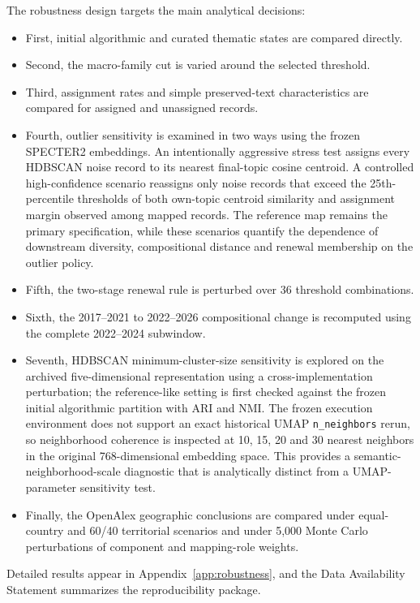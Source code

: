\documentclass[futureinternet,article,submit,moreauthors]{Definitions/mdpi}
\begin{document}
The robustness design targets the main analytical decisions:
\begin{itemize} 
    \item First, initial algorithmic and curated thematic states are compared directly. 
    \item Second, the macro-family cut is varied around the selected threshold. 
    \item Third, assignment rates and simple preserved-text characteristics are compared for assigned and unassigned records. 
    \item Fourth, outlier sensitivity is examined in two ways using the frozen SPECTER2 embeddings. An intentionally aggressive stress test assigns every HDBSCAN noise record to its nearest final-topic cosine centroid. A controlled high-confidence scenario reassigns only noise records that exceed the 25th-percentile thresholds of both own-topic centroid similarity and assignment margin observed among mapped records. The reference map remains the primary specification, while these scenarios quantify the dependence of downstream diversity, compositional distance and renewal membership on the outlier policy.
    \item Fifth, the two-stage renewal rule is perturbed over 36 threshold combinations. 
    \item Sixth, the 2017--2021 to 2022--2026 compositional change is recomputed using the complete 2022--2024 subwindow.
    \item Seventh, HDBSCAN minimum-cluster-size sensitivity is explored on the archived five-dimensional representation using a cross-implementation perturbation; the reference-like setting is first checked against the frozen initial algorithmic partition with ARI and NMI. The frozen execution environment does not support an exact historical UMAP \texttt{n\_neighbors} rerun, so neighborhood coherence is inspected at 10, 15, 20 and 30 nearest neighbors in the original 768-dimensional embedding space. This provides a semantic-neighborhood-scale diagnostic that is analytically distinct from a UMAP-parameter sensitivity test. 
    \item Finally, the OpenAlex geographic conclusions are compared under equal-country and 60/40 territorial scenarios and under 5,000 Monte Carlo perturbations of component and mapping-role weights.
\end{itemize}

Detailed results appear in Appendix~\ref{app:robustness}, and the Data Availability Statement summarizes the reproducibility package.
\end{document}
